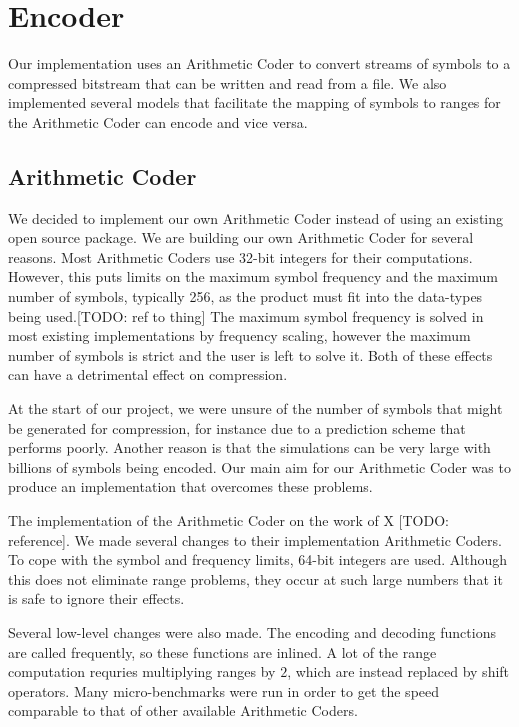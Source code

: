 \documentclass[a4paper,11pt]{report}
\begin{document}
\section{Encoder}

Our implementation uses an Arithmetic Coder to convert streams of symbols to a compressed bitstream that can be written and read from a file. We also implemented several models that facilitate the mapping of symbols to ranges for the Arithmetic Coder can encode and vice versa.

\subsection{Arithmetic Coder}

We decided to implement our own Arithmetic Coder instead of using an existing open source package. We are building our own Arithmetic Coder for several reasons. Most Arithmetic Coders use 32-bit integers for their computations. However, this puts limits on the maximum symbol frequency and the maximum number of symbols, typically 256, as the product must fit into the data-types being used.[TODO: ref to thing] The maximum symbol frequency is solved in most existing implementations by frequency scaling, however the maximum number of symbols is strict and the user is left to solve it. Both of these effects can have a detrimental effect on compression. 

At the start of our project, we were unsure of the number of symbols that might be generated for compression, for instance due to a prediction scheme that performs poorly. Another reason is that the simulations can be very large with billions of symbols being encoded. Our main aim for our Arithmetic Coder was to produce an implementation that overcomes these problems.

The implementation of the Arithmetic Coder on the work of X [TODO: reference]. We made several changes to their implementation Arithmetic Coders. To cope with the symbol and frequency limits, 64-bit integers are used. Although this does not eliminate range problems, they occur at such large numbers that it is safe to ignore their effects.

Several low-level changes were also made. The encoding and decoding functions are called frequently, so these functions are inlined. A lot of the range computation requries multiplying ranges by $2$, which are instead replaced by shift operators. Many micro-benchmarks were run in order to get the speed comparable to that of other available Arithmetic Coders.
\end{document}
